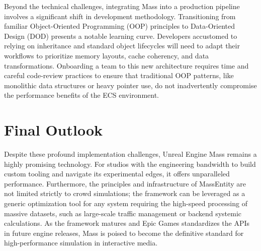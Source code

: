 Beyond the technical challenges, integrating Mass into a production pipeline involves a significant shift in development methodology. Transitioning from familiar Object-Oriented Programming (OOP) principles to Data-Oriented Design (DOD) presents a notable learning curve. Developers accustomed to relying on inheritance and standard object lifecycles will need to adapt their workflows to prioritize memory layouts, cache coherency, and data transformations. Onboarding a team to this new architecture requires time and careful code-review practices to ensure that traditional OOP patterns, like monolithic data structures or heavy pointer use, do not inadvertently compromise the performance benefits of the ECS environment.

\section{Final Outlook}

Despite these profound implementation challenges, Unreal Engine Mass remains a highly promising technology. For studios with the engineering bandwidth to build custom tooling and navigate its experimental edges, it offers unparalleled performance. Furthermore, the principles and infrastructure of MassEntity are not limited strictly to crowd simulations; the framework can be leveraged as a generic optimization tool for any system requiring the high-speed processing of massive datasets, such as large-scale traffic management or backend systemic calculations. As the framework matures and Epic Games standardizes the APIs in future engine releases, Mass is poised to become the definitive standard for high-performance simulation in interactive media.